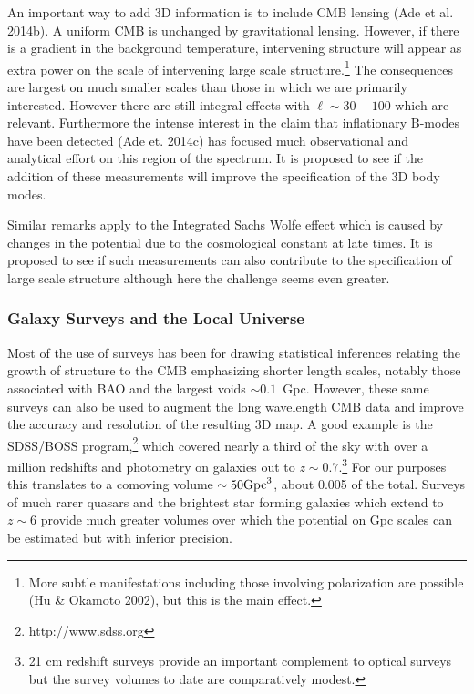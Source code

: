 \documentclass[psfig,11pt]{article}
\begin{document}
An important way to add 3D information is to include CMB lensing (Ade et al. 2014b). A uniform CMB is unchanged by gravitational lensing. However, if there is a gradient in the background temperature, intervening structure will appear as extra power on the scale of intervening large scale structure.\footnote{More subtle manifestations including those involving polarization are possible (Hu \& Okamoto 2002), but this is the main effect.} The consequences are largest on much smaller scales than those in which we are primarily interested. However there are still integral effects with $\ell\sim30-100$ which are relevant. Furthermore the intense interest in the claim that inflationary B-modes have been detected (Ade et. 2014c)  has focused much observational and analytical effort on this region of the spectrum. It is proposed to see if the addition of these measurements will improve the specification of the 3D body modes.

Similar remarks apply to the Integrated Sachs Wolfe effect which is caused by changes in the potential due to the cosmological constant at late times. It is proposed to see if such measurements can also contribute to the specification of large scale structure although here the challenge seems even greater.

\subsubsection{Galaxy Surveys and the Local Universe}

Most of the use of surveys has been for drawing statistical inferences relating the growth of structure to the CMB emphasizing shorter length scales, notably those associated with BAO and the largest voids $\sim0.1$~Gpc. However, these same surveys can also be used to augment the long wavelength CMB data and improve the accuracy and resolution of the resulting 3D map. A good example is the SDSS/BOSS program,\footnote{http://www.sdss.org} which covered nearly a third of the sky with over a million redshifts and photometry on galaxies out to $z\sim0.7$.\footnote{21 cm redshift surveys provide an important complement to optical surveys but the survey volumes to date are comparatively modest.} For our purposes this translates to a comoving volume $\sim50{\rm Gpc}^3$, about 0.005 of the total. Surveys of much rarer quasars and the brightest star forming galaxies which extend to  $z\sim6$ provide much greater volumes over which the potential on Gpc scales can be estimated but with inferior precision.
\end{document}
